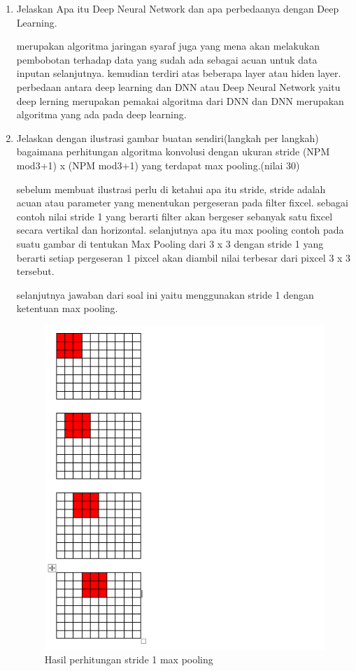 \begin{enumerate}
\item Jelaskan Apa itu Deep Neural Network dan apa perbedaanya dengan Deep Learning.\par
merupakan algoritma jaringan syaraf juga yang mena akan melakukan pembobotan terhadap data yang sudah ada sebagai acuan untuk data inputan selanjutnya. kemudian terdiri atas beberapa layer atau hiden layer. perbedaan antara deep learning dan DNN atau Deep Neural Network yaitu deep lerning merupakan pemakai algoritma dari DNN dan DNN merupakan algoritma yang ada pada deep learning.

\item Jelaskan dengan ilustrasi gambar buatan sendiri(langkah per langkah) bagaimana perhitungan algoritma konvolusi dengan ukuran stride (NPM mod3+1) x (NPM mod3+1) yang terdapat max pooling.(nilai 30)\par
sebelum membuat ilustrasi perlu di ketahui apa itu stride, stride adalah acuan atau parameter yang menentukan pergeseran pada filter fixcel. sebagai contoh nilai stride 1 yang berarti filter akan bergeser sebanyak satu fixcel secara vertikal dan horizontal. selanjutnya apa itu max pooling contoh pada suatu gambar di tentukan Max Pooling dari 3 x 3 dengan stride 1 yang berarti setiap pergeseran 1 pixcel akan diambil nilai terbesar dari pixcel 3 x 3 tersebut.\par

selanjutnya jawaban dari soal ini yaitu menggunakan stride 1 dengan ketentuan max pooling. 
\begin{figure}[ht]
\centering
\includegraphics[scale=0.4]{figures/1174002/chapter7/10.PNG}
\caption{Hasil perhitungan stride 1 max pooling}
\label{Contoh}
\end{figure}

\end{enumerate}

